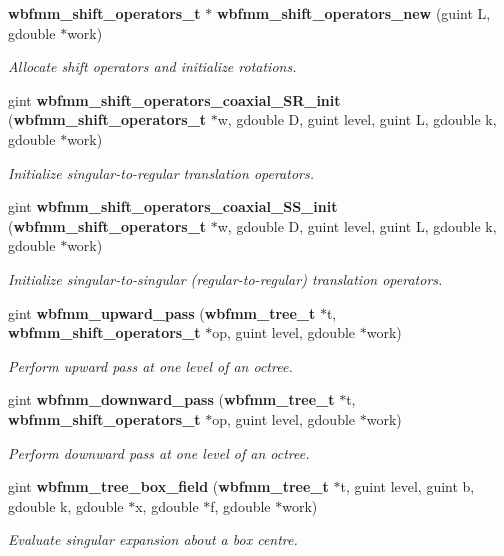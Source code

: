 \begin{DoxyCompactItemize}
{\bf wbfmm\+\_\+shift\+\_\+operators\+\_\+t} $\ast$ {\bf wbfmm\+\_\+shift\+\_\+operators\+\_\+new} (guint L, gdouble $\ast$work)
\begin{DoxyCompactList}\small\item\em Allocate shift operators and initialize rotations. \end{DoxyCompactList}\item 
gint {\bf wbfmm\+\_\+shift\+\_\+operators\+\_\+coaxial\+\_\+\+S\+R\+\_\+init} ({\bf wbfmm\+\_\+shift\+\_\+operators\+\_\+t} $\ast$w, gdouble D, guint level, guint L, gdouble k, gdouble $\ast$work)
\begin{DoxyCompactList}\small\item\em Initialize singular-\/to-\/regular translation operators. \end{DoxyCompactList}\item 
gint {\bf wbfmm\+\_\+shift\+\_\+operators\+\_\+coaxial\+\_\+\+S\+S\+\_\+init} ({\bf wbfmm\+\_\+shift\+\_\+operators\+\_\+t} $\ast$w, gdouble D, guint level, guint L, gdouble k, gdouble $\ast$work)
\begin{DoxyCompactList}\small\item\em Initialize singular-\/to-\/singular (regular-\/to-\/regular) translation operators. \end{DoxyCompactList}\item 
gint {\bf wbfmm\+\_\+upward\+\_\+pass} ({\bf wbfmm\+\_\+tree\+\_\+t} $\ast$t, {\bf wbfmm\+\_\+shift\+\_\+operators\+\_\+t} $\ast$op, guint level, gdouble $\ast$work)
\begin{DoxyCompactList}\small\item\em Perform upward pass at one level of an octree. \end{DoxyCompactList}\item 
gint {\bf wbfmm\+\_\+downward\+\_\+pass} ({\bf wbfmm\+\_\+tree\+\_\+t} $\ast$t, {\bf wbfmm\+\_\+shift\+\_\+operators\+\_\+t} $\ast$op, guint level, gdouble $\ast$work)
\begin{DoxyCompactList}\small\item\em Perform downward pass at one level of an octree. \end{DoxyCompactList}\item 
gint {\bf wbfmm\+\_\+tree\+\_\+box\+\_\+field} ({\bf wbfmm\+\_\+tree\+\_\+t} $\ast$t, guint level, guint b, gdouble k, gdouble $\ast$x, gdouble $\ast$f, gdouble $\ast$work)
\begin{DoxyCompactList}\small\item\em Evaluate singular expansion about a box centre. \end{DoxyCompactList}\item 

\end{DoxyCompactItemize}
